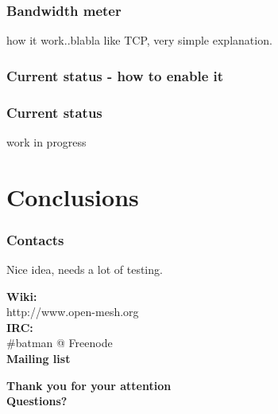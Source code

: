 \documentclass[slidestop]{beamer}
\begin{document}
\begin{frame}[c]
	\frametitle{Bandwidth meter}
	how it work..blabla like TCP, very simple explanation.
\end{frame}

\begin{frame}[c]
	\frametitle{Current status - how to enable it}
\end{frame}

\begin{frame}[c]
	\frametitle{Current status}
	work in progress
\end{frame}

\section{Conclusions}
\begin{frame}
	\frametitle{Contacts}
	Nice idea, needs a lot of testing.

	\textbf{Wiki:}\\
	http://www.open-mesh.org\\
	\textbf{IRC:}\\
	#batman @ Freenode\\
	\textbf{Mailing list}

\end{frame}

\begin{frame}[c]
	\begin{center}
	\Large{\textbf{Thank you for your attention\\[1cm]
	Questions?}}
	\end{center}
\end{frame}
\end{document}
